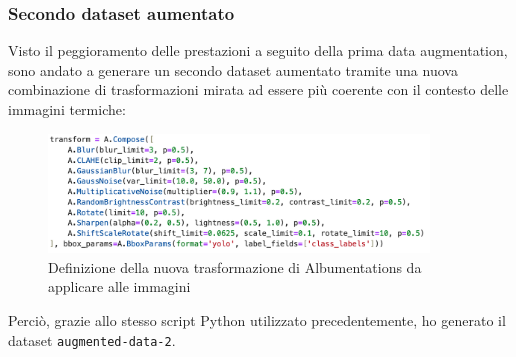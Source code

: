 \subsubsection{Secondo dataset aumentato}
Visto il peggioramento delle prestazioni a seguito della prima data augmentation, sono andato a generare un secondo dataset aumentato tramite una nuova combinazione di trasformazioni mirata ad essere più coerente con il contesto delle immagini termiche:

\begin{figure}[ht]
    \centering
    \includegraphics[width=0.9\textwidth]{files/capitoli/4-sperimentazione-risultati/assets/transform-2.png}
    \caption{\label{fig:transform-2}Definizione della nuova trasformazione di Albumentations da applicare alle immagini}
\end{figure}

Perciò, grazie allo stesso script Python utilizzato precedentemente, ho generato il dataset \texttt{augmented-data-2}.


\clearpage

